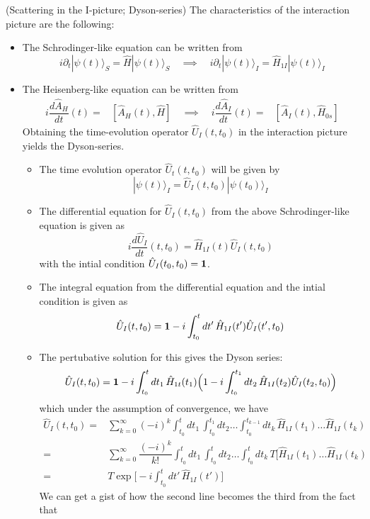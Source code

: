\begin{defi}
(Scattering in the I-picture; Dyson-series) The characteristics of the interaction picture are the following:
\begin{itemize}
\item[(i)] The Schrodinger-like equation can be written from
\[i\partial _{t}|\psi (t)\rangle _{S}=\hat{H}|\psi (t)\rangle _{S}\quad\implies \quad i\partial _{t}|\psi (t)\rangle _{I}=\hat{H}_{1I}|\psi (t)\rangle _{I}\]
\item[(ii)] The Heisenberg-like equation can be written from
\[\begin{align*}
i\dfrac{d \hat{A}_{H}}{d t}(t)=&[\hat{A}_{H}(t),\hat{H}]\quad\implies \quad i\dfrac{d \hat{A}_{I}}{d t}(t)=&[\hat{A}_{I}(t),\hat{H}_{0s}] 
\end{align*}\]
Obtaining the time-evolution operator $\hat{U}_{I}(t,t_0)$ in the interaction picture yields the Dyson-series. 
\begin{itemize}
\item[(i)] The time evolution operator $\hat{U}_{t}(t,t_0)$ will be given by
\[|\psi (t)\rangle _{I}=\hat{U}_{I}(t,t_0)|\psi (t_0)\rangle _{I}\]
\item[(ii)] The differential equation for $\hat{U}_{I}(t,t_0)$ from the above Schrodinger-like equation is given as
\[i\dfrac{d \hat{U}_{I}}{d t}(t,t_0)=\hat{H}_{1I}(t)\hat{U}_{I}(t,t_0) \]
with the intial condition $\hat{U}_{I}(t_0,t_0)={\bf 1}$. 
\item[(iii)] The integral equation from the differential equation and the intial condition is given as
\[\hat{U}_{I}(t,t_0)={\bf 1}-i\int ^{t}_{t_0}dt'\,\hat{H}_{1I}(t')\hat{U}_{I}(t',t_0)\]
\item[(iv)] The pertubative solution for this gives the Dyson series:
\[\hat{U}_{I}(t,t_0)={\bf 1}-i\int ^{t}_{t_0}dt_1\,\hat{H}_{1t}(t_1)\Big(1-i\int ^{t_1}_{t_0}dt_2\,\hat{H}_{1I}(t_2)\hat{U}_{I}(t_2,t_0)\Big)\]
which under the assumption of convergence, we have
\[\begin{align*}
\hat{U}_{I}(t,t_0)=&\sum ^{\infty }_{k=0}(-i)^{k}\int ^{t}_{t_0}dt_1\,\int ^{t_1}_{t_0}dt_2\ldots \int ^{t_{k-1}}_{t_0}dt_{k}\,\hat{H}_{1I}(t_1)\ldots \hat{H}_{1I}(t_{k})\\
=& \sum ^{\infty }_{k=0}\dfrac{(-i)^{k}}{k!}\int ^{t}_{t_0}dt_1\,\int ^{t}_{t_0}dt_2\ldots \int ^{t}_{t_0}dt_{k}\,T[\hat{H}_{1I}(t_1)\ldots \hat{H}_{1I}(t_{k})\\
=&T\exp \Big[-i\int ^{t}_{t_0}dt'\,\hat{H}_{1I}(t')\Big]
\end{align*}\]
We can get a gist of how the second line becomes the third from the fact that 

\end{itemize}
\end{itemize}
\end{defi}
